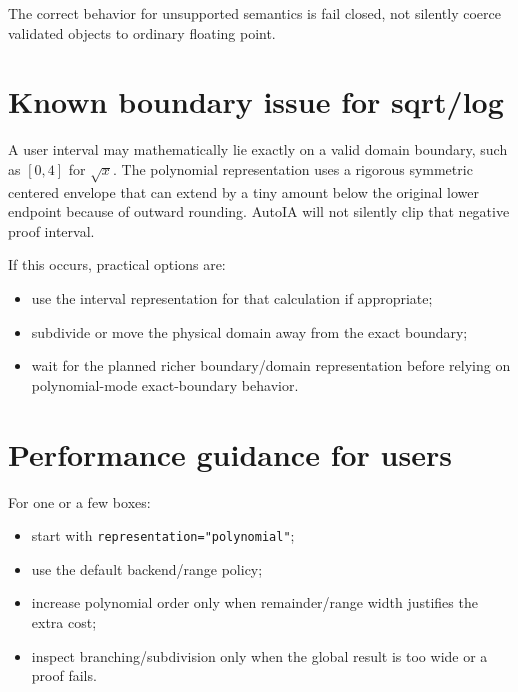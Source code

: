 \documentclass[11pt]{article}
\begin{document}
The correct behavior for unsupported semantics is fail closed, not silently
coerce validated objects to ordinary floating point.

\section{Known boundary issue for sqrt/log}

A user interval may mathematically lie exactly on a valid domain boundary, such
as \([0,4]\) for \(\sqrt{x}\).  The polynomial representation uses a rigorous
symmetric centered envelope that can extend by a tiny amount below the original
lower endpoint because of outward rounding.  AutoIA will not silently clip that
negative proof interval.

If this occurs, practical options are:
\begin{itemize}[leftmargin=*]
\item use the interval representation for that calculation if appropriate;
\item subdivide or move the physical domain away from the exact boundary;
\item wait for the planned richer boundary/domain representation before relying
on polynomial-mode exact-boundary behavior.
\end{itemize}

\section{Performance guidance for users}

For one or a few boxes:
\begin{itemize}[leftmargin=*]
\item start with \texttt{representation="polynomial"};
\item use the default backend/range policy;
\item increase polynomial order only when remainder/range width justifies the
extra cost;
\item inspect branching/subdivision only when the global result is too wide or a
proof fails.
\end{itemize}
\end{document}
